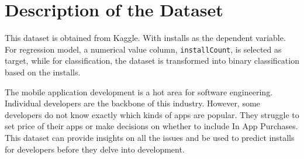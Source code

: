 \section{Description of the Dataset}

This dataset is obtained from Kaggle. With installs as the dependent variable. For regression model, a numerical value column, \texttt{installCount}, is selected as target, while for classification, the dataset is transformed into binary classification based on the installs.

The mobile application development is a hot area for software engineering. Individual developers are the backbone of this industry. However, some developers do not know exactly which kinds of apps are popular. They struggle to set price of their apps or make decisions on whether to include In App Purchases. This dataset can provide insights on all the issues and be used to predict installs for developers before they delve into development.
